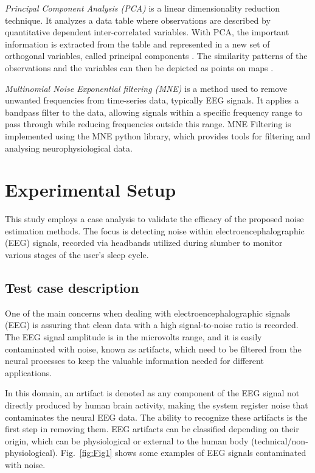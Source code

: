 \documentclass[conference]{IEEEtran}
\begin{document}
\emph{Principal Component Analysis (PCA)} is a linear dimensionality
reduction technique. It analyzes a data table where observations are
described by quantitative dependent inter-correlated variables. With
PCA, the important information is extracted from the table and
represented in a new set of orthogonal variables, called principal
components \cite{bro2014principal}. The similarity patterns of the
observations and the variables can then be depicted as points on maps
\cite{abdi2010principal}.

\emph{Multinomial Noise Exponential filtering (MNE)} is a method used
to remove unwanted frequencies from time-series data, typically EEG
signals. It applies a bandpass filter to the data, allowing signals
within a specific frequency range to pass through while reducing
frequencies outside this range. MNE Filtering is implemented using the
MNE python library, which provides tools for filtering and analysing
neurophysiological data.




\section{Experimental Setup}
\label{sec:exp}



This study employs a case analysis to validate the efficacy of the proposed noise estimation methods. The focus is detecting noise within electroencephalographic (EEG) signals, recorded via headbands utilized during slumber to monitor various stages of the user's sleep cycle.

\subsection{Test case description}

One of the main concerns when dealing with electroencephalographic signals (EEG) is assuring that clean data with a high signal-to-noise ratio is recorded. The EEG signal amplitude is in the microvolts range, and it is easily contaminated with noise, known as artifacts, which need to be filtered from the neural processes to keep the valuable information needed for different applications.

In this domain, an artifact is denoted as any component of the EEG signal not directly produced by human brain activity, making the system register noise that contaminates the neural EEG data. The ability to recognize these artifacts is the first step in removing them. EEG artifacts can be classified depending on their origin, which can be physiological or external to the human body (technical/non-physiological). Fig.~\ref{fig:Fig1} shows some examples of EEG signals contaminated with noise.
\end{document}
